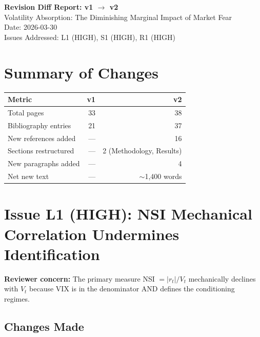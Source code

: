 \documentclass[12pt,a4paper]{article}
\begin{document}
\begin{center}
{\Large\bfseries Revision Diff Report: v1 $\to$ v2}\\[0.5em]
{\large Volatility Absorption: The Diminishing Marginal Impact of Market Fear}\\[0.5em]
{\normalsize Date: 2026-03-30}\\
{\normalsize Issues Addressed: L1 (HIGH), S1 (HIGH), R1 (HIGH)}
\end{center}

\vspace{1em}

\section*{Summary of Changes}

\begin{tabular}{lrr}
\toprule
\textbf{Metric} & \textbf{v1} & \textbf{v2} \\
\midrule
Total pages & 33 & 38 \\
Bibliography entries & 21 & 37 \\
New references added & --- & 16 \\
Sections restructured & --- & 2 (Methodology, Results) \\
New paragraphs added & --- & 4 \\
Net new text & --- & $\sim$1{,}400 words \\
\bottomrule
\end{tabular}

\vspace{1em}

\section*{Issue L1 (HIGH): NSI Mechanical Correlation Undermines Identification}

\textbf{Reviewer concern:} The primary measure NSI $= |r_t|/V_t$ mechanically declines with $V_t$ because VIX is in the denominator AND defines the conditioning regimes.

\subsection*{Changes Made}
\end{document}
